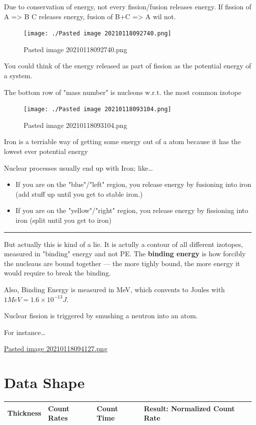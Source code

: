 \documentclass[letterpaper]{article}
\begin{document}
Due to conservation of energy, not every fission/fusion releases energy.
If fission of A => B C releases energy, fusion of B+C => A wil not.

\begin{figure}[htbp]
\centering
\texttt{[image: ./Pasted image 20210118092740.png]}
\caption{Pasted image 20210118092740.png}
\end{figure}

You could think of the energy released as part of fission as the
potential energy of a system.

The bottom row of "mass number" is nucleons w.r.t. the most common
izotope

\begin{figure}[htbp]
\centering
\texttt{[image: ./Pasted image 20210118093104.png]}
\caption{Pasted image 20210118093104.png}
\end{figure}

Iron is a terriable way of getting some energy out of a atom because it
has the lowest ever potential energy

Nuclear processes usually end up with Iron; like\ldots{}

\begin{itemize}
\item If you are on the "blue"/"left" region, you release energy by
fusioning into iron (add stuff up until you get to stable iron.)
\item If you are on the "yellow"/"right" region, you release energy by
fissioning into iron (split until you get to iron)
\end{itemize}

\noindent\rule{\textwidth}{0.5pt}

But actually this is kind of a lie. It is actully a contour of all
different izotopes, measured in "binding" energy and not PE. The
\textbf{binding energy} is how forcibly the nucleaus are bound together --- the
more tighly bound, the more energy it would require to break the
binding.

Also, Binding Energy is measured in MeV, which convents to Joules with
\(1 MeV = 1.6 \times 10^{-13} J\).

Nuclear fission is triggered by smushing a neutron into an atom.

For instance\ldots{}

\href{Pasted image 20210118094127.png.org}{Pasted image
20210118094127.png}

\section{Data Shape}
\label{sec:orgf1a95b1}
\begin{center}
\begin{tabular}{llll}
Thickness & Count Rates & Count Time & Result: Normalized Count Rate\\
\hline
\end{tabular}
\end{center}
\end{document}

